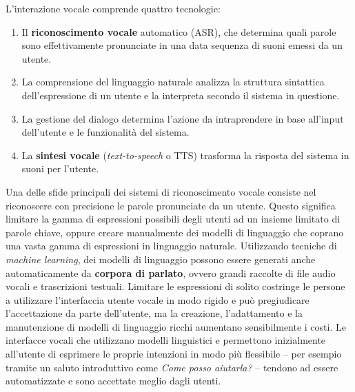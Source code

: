 \begin{multicols}{2}
L'interazione vocale comprende quattro tecnologie: 

\begin{enumerate}
\item Il \textbf{riconoscimento vocale} automatico (ASR), che determina quali parole sono effettivamente pronunciate in una data sequenza di suoni emessi da un utente.
\item La comprensione del linguaggio naturale analizza la struttura sintattica dell'espressione di un utente e la interpreta secondo il sistema in questione.
\item La gestione del dialogo determina l'azione da intraprendere in base all'input dell'utente e le funzionalit\`{a} del sistema.
\item La \textbf{sintesi vocale} (\emph{text-to-speech} o TTS) trasforma la risposta del sistema in suoni per l'utente.
\end{enumerate}



Una delle sfide principali dei sistemi di riconoscimento vocale consiste nel riconoscere con precisione le parole pronunciate da un utente. Questo significa limitare la gamma di espressioni possibili degli utenti ad un insieme limitato di parole chiave, oppure creare manualmente dei modelli di linguaggio che coprano una vasta gamma di espressioni in linguaggio naturale. Utilizzando tecniche di \emph{machine learning}, dei modelli di linguaggio possono essere generati anche automaticamente da \textbf{corpora di parlato}, ovvero grandi raccolte di file audio vocali e trascrizioni testuali. Limitare le espressioni di solito costringe le persone a utilizzare l'interfaccia utente vocale in modo rigido e pu\`{o} pregiudicare l'accettazione da parte dell'utente, ma la creazione, l'adattamento e la manutenzione di modelli di linguaggio ricchi aumentano sensibilmente i costi. Le interfacce vocali che utilizzano modelli linguistici e permettono inizialmente all'utente di esprimere le proprie intenzioni in modo pi\`{u} flessibile -- per esempio tramite un saluto introduttivo come \emph{Come posso aiutarla?} -- tendono ad essere automatizzate e sono accettate meglio dagli utenti.


\end{multicols}
